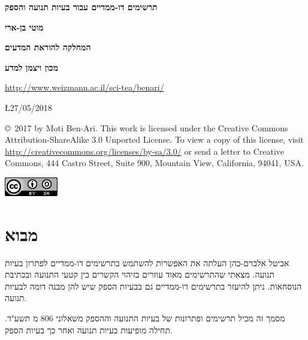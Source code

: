 \documentclass[12pt,a4paper]{article}
\begin{document}
\thispagestyle{empty}


\begin{center}
\textbf{\LARGE תרשימים דו-ממדיים עבור בעיות תנועה והספק}

\bigskip
\bigskip

\textbf{\Large מוטי בן-ארי}

\bigskip

\textbf{\large המחלקה להוראת המדעים}

\bigskip

\textbf{\large מכון ויצמן למדע}

\bigskip

\url{http://www.weizmann.ac.il/sci-tea/benari/}

\bigskip

\L{27/05/2018}

\end{center}


\begin{footnotesize}
\copyright{}\  2017 by Moti Ben-Ari. This work is licensed under the Creative Commons Attribution-ShareAlike 3.0 Unported License. To view a copy of this license, visit \url{http://creativecommons.org/licenses/by-sa/3.0/} or send a letter to Creative Commons, 444 Castro Street, Suite 900, Mountain View, California, 94041, USA.
\end{footnotesize}

\bigskip

\begin{center}
\includegraphics[width=.15\textwidth]{../by-sa.png}
\end{center}


\section*{מבוא}

אביטל אלבוים-כהן העלתה את האפשרות להשתמש בתרשימים דו-ממדיים לפתרון בעיות תנועה. מצאתי שהתרשימים מאוד עוזרים בזיהוי הקשרים בין קטעי התנועה ובכתיבת הנוסחאות. ניתן להיעזר בתרשימים דו-ממדיים גם בבעיות הספק שיש להן מבנה דומה לבעיות תנועה.

\smallskip

מסמך זה מכיל תרשימים ופתרונות של בעיות התנועה וההספק משאלוני
$806$
מ תשע"ד. תחילה מופיעות בעיות תנועה ואחר כך בעיות הספק.
\end{document}
